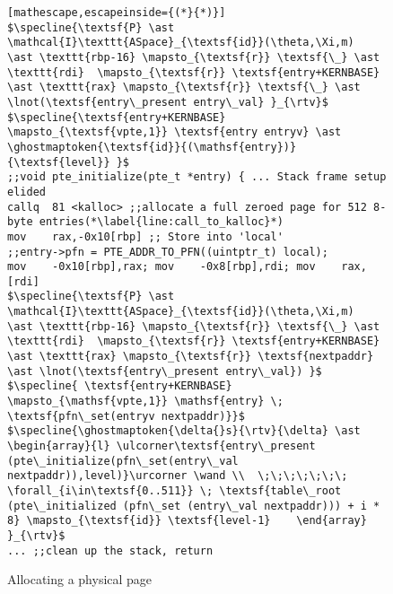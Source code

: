 \begin{figure}\footnotesize
  \begin{lstlisting}[mathescape,escapeinside={(*}{*)}]
$\specline{\textsf{P} \ast \mathcal{I}\texttt{ASpace}_{\textsf{id}}(\theta,\Xi,m)   \ast \texttt{rbp-16} \mapsto_{\textsf{r}} \textsf{\_} \ast \texttt{rdi}  \mapsto_{\textsf{r}} \textsf{entry+KERNBASE}  \ast \texttt{rax} \mapsto_{\textsf{r}} \textsf{\_} \ast \lnot(\textsf{entry\_present entry\_val} }_{\rtv}$
$\specline{\textsf{entry+KERNBASE} \mapsto_{\textsf{vpte,1}} \textsf{entry entryv} \ast \ghostmaptoken{\textsf{id}}{(\mathsf{entry})}{\textsf{level}} }$
;;void pte_initialize(pte_t *entry) { ... Stack frame setup elided    
callq  81 <kalloc> ;;allocate a full zeroed page for 512 8-byte entries(*\label{line:call_to_kalloc}*)
mov    rax,-0x10[rbp] ;; Store into 'local'
;;entry->pfn = PTE_ADDR_TO_PFN((uintptr_t) local);
mov    -0x10[rbp],rax; mov    -0x8[rbp],rdi; mov    rax,[rdi]
$\specline{\textsf{P} \ast \mathcal{I}\texttt{ASpace}_{\textsf{id}}(\theta,\Xi,m)   \ast \texttt{rbp-16} \mapsto_{\textsf{r}} \textsf{\_} \ast \texttt{rdi}  \mapsto_{\textsf{r}} \textsf{entry+KERNBASE} \ast \texttt{rax} \mapsto_{\textsf{r}} \textsf{nextpaddr} \ast \lnot(\textsf{entry\_present entry\_val}) }$
$\specline{ \textsf{entry+KERNBASE} \mapsto_{\mathsf{vpte,1}} \mathsf{entry} \; \textsf{pfn\_set(entryv nextpaddr)}}$
$\specline{\ghostmaptoken{\delta{}s}{\rtv}{\delta} \ast \begin{array}{l} \ulcorner\textsf{entry\_present (pte\_initialize(pfn\_set(entry\_val nextpaddr)),level)}\urcorner \wand \\  \;\;\;\;\;\;\; \forall_{i\in\textsf{0..511}} \; \textsf{table\_root (pte\_initialized (pfn\_set (entry\_val nextpaddr))) + i * 8} \mapsto_{\textsf{id}} \textsf{level-1}    \end{array}  }_{\rtv}$
... ;;clean up the stack, return
\end{lstlisting}
\vspace{-1em}
\caption{Allocating a physical page }
\label{pteinitializespec}
\vspace{-1em}
\end{figure}

